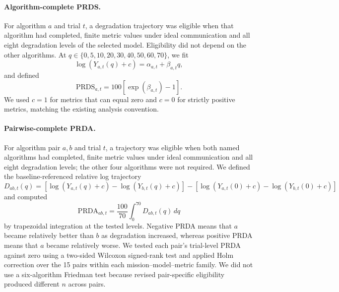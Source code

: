 \paragraph{Algorithm-complete PRDS.}
For algorithm $a$ and trial $t$, a degradation trajectory was eligible when that algorithm had completed, finite metric values under ideal communication and all eight degradation levels of the selected model.  Eligibility did not depend on the other algorithms.  At $q\in\{0,5,10,20,30,40,50,60,70\}$, we fit
\begin{equation}
  \log\!\left(Y_{a,t}(q)+c\right)=\alpha_{a,t}+\beta_{a,t}q,
\end{equation}
and defined
\begin{equation}
  \mathrm{PRDS}_{a,t}=100\left[\exp(\beta_{a,t})-1\right].
\end{equation}
We used $c=1$ for metrics that can equal zero and $c=0$ for strictly positive metrics, matching the existing analysis convention.

\paragraph{Pairwise-complete PRDA.}
For algorithm pair $a,b$ and trial $t$, a trajectory was eligible when both named algorithms had completed, finite metric values under ideal communication and all eight degradation levels; the other four algorithms were not required.  We defined the baseline-referenced relative log trajectory
\begin{equation}
  D_{ab,t}(q)=\left[\log(Y_{a,t}(q)+c)-\log(Y_{b,t}(q)+c)\right]
  -\left[\log(Y_{a,t}(0)+c)-\log(Y_{b,t}(0)+c)\right]
\end{equation}
and computed
\begin{equation}
  \mathrm{PRDA}_{ab,t}=\frac{100}{70}\int_{0}^{70}D_{ab,t}(q)\,dq
\end{equation}
by trapezoidal integration at the tested levels.  Negative PRDA means that $a$ became relatively better than $b$ as degradation increased, whereas positive PRDA means that $a$ became relatively worse.  We tested each pair's trial-level PRDA against zero using a two-sided Wilcoxon signed-rank test and applied Holm correction over the 15 pairs within each mission--model--metric family.  We did not use a six-algorithm Friedman test because revised pair-specific eligibility produced different $n$ across pairs.

